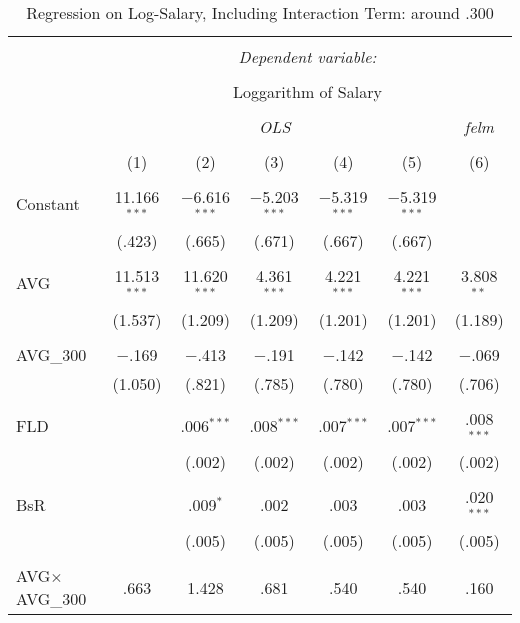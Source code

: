 
\begin{table}[H] \centering
  \caption{Regression on Log-Salary, Including Interaction Term: around .300}
  \label{AVG300_A}
\fontsize{4pt}{4pt}\selectfont
\begin{tabular}{@{\extracolsep{-10pt}}lcccccc}
\\[-1.8ex]\hline
\hline \\[-1.8ex]
 & \multicolumn{6}{c}{\textit{Dependent variable:}} \\
\cline{2-7}
\\[-1.8ex] & \multicolumn{6}{c}{Loggarithm of Salary} \\
\\[-1.8ex] & \multicolumn{5}{c}{\textit{OLS}} & \textit{felm} \\
\\[-1.8ex] & (1) & (2) & (3) & (4) & (5) & (6)\\
\hline \\[-1.8ex]
 Constant & 11.166$^{***}$ & $-$6.616$^{***}$ & $-$5.203$^{***}$ & $-$5.319$^{***}$ & $-$5.319$^{***}$ &  \\
  & (.423) & (.665) & (.671) & (.667) & (.667) &  \\
  & & & & & & \\
 AVG & 11.513$^{***}$ & 11.620$^{***}$ & 4.361$^{***}$ & 4.221$^{***}$ & 4.221$^{***}$ & 3.808$^{**}$ \\
  & (1.537) & (1.209) & (1.209) & (1.201) & (1.201) & (1.189) \\
  & & & & & & \\
 AVG\_300 & $-$.169 & $-$.413 & $-$.191 & $-$.142 & $-$.142 & $-$.069 \\
  & (1.050) & (.821) & (.785) & (.780) & (.780) & (.706) \\
  & & & & & & \\
 FLD &  & .006$^{***}$ & .008$^{***}$ & .007$^{***}$ & .007$^{***}$ & .008$^{***}$ \\
  &  & (.002) & (.002) & (.002) & (.002) & (.002) \\
  & & & & & & \\
 BsR &  & .009$^{*}$ & .002 & .003 & .003 & .020$^{***}$ \\
  &  & (.005) & (.005) & (.005) & (.005) & (.005) \\
  & & & & & & \\
 AVG$\times$AVG\_300 & .663 & 1.428 & .681 & .540 & .540 & .160 \\

\end{tabular}
\end{table}
